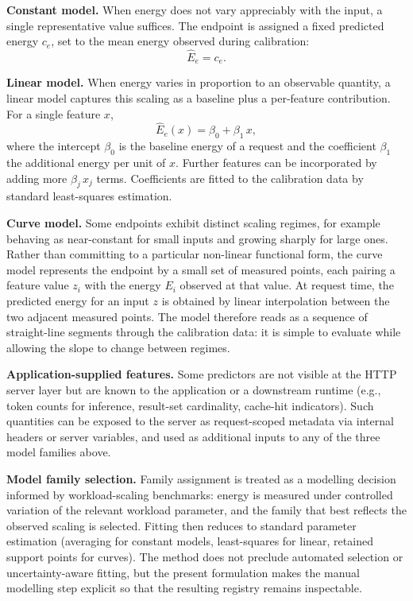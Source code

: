 \documentclass[sigconf]{acmart}
\begin{document}
\textbf{Constant model.}
When energy does not vary appreciably with the input, a single
representative value suffices. The endpoint is assigned a fixed
predicted energy \(c_e\), set to the mean energy observed during
calibration:
\[
\widehat{E}_e = c_e.
\]

\textbf{Linear model.}
When energy varies in proportion to an observable quantity, a linear
model captures this scaling as a baseline plus a per-feature
contribution. For a single feature \(x\),
\[
\widehat{E}_e(x) = \beta_0 + \beta_1\, x,
\]
where the intercept \(\beta_0\) is the baseline energy of a request and
the coefficient \(\beta_1\) the additional energy per unit of \(x\).
Further features can be incorporated by adding more
\(\beta_j\, x_j\) terms. Coefficients are fitted to the calibration
data by standard least-squares estimation.

\textbf{Curve model.}
Some endpoints exhibit distinct scaling regimes, for example behaving
as near-constant for small inputs and growing sharply for large ones.
Rather than committing to a particular non-linear functional form, the
curve model represents the endpoint by a small set of measured points,
each pairing a feature value \(z_i\) with the energy \(E_i\) observed
at that value. At request time, the predicted energy for an input
\(z\) is obtained by linear interpolation between the two adjacent
measured points. The model therefore reads as a sequence of
straight-line segments through the calibration data: it is simple to
evaluate while allowing the slope to change between regimes.

\textbf{Application-supplied features.}
Some predictors are not visible at the HTTP server layer but are known to the application or a downstream runtime (e.g., token counts for inference, result-set cardinality, cache-hit indicators). Such quantities can be exposed to the server as request-scoped metadata via internal headers or server variables, and used as additional inputs to any of the three model families above.

\textbf{Model family selection.}
Family assignment is treated as a modelling decision informed by workload-scaling benchmarks: energy is measured under controlled variation of the relevant workload parameter, and the family that best reflects the observed scaling is selected. Fitting then reduces to standard parameter estimation (averaging for constant models, least-squares for linear, retained support points for curves). The method does not preclude automated selection or uncertainty-aware fitting, but the present formulation makes the manual modelling step explicit so that the resulting registry remains inspectable.
\end{document}
